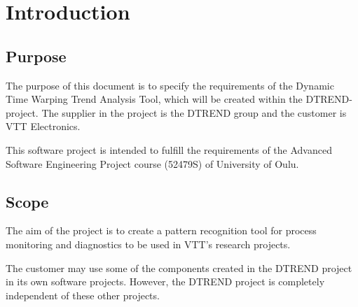 \documentclass[a4paper,11pt]{article}
\begin{document}
\tableofcontents
\newpage

\section{Introduction}

\subsection{Purpose}

The purpose of this document is to specify the requirements of the Dynamic Time Warping Trend Analysis Tool,
which will be created within the DTREND-project. The supplier in the project is the DTREND group and the customer 
is VTT Electronics.

This software project is intended to fulfill the requirements of the Advanced Software Engineering Project course 
(52479S) of University of Oulu.

\subsection{Scope}

The aim of the project is to create a pattern recognition tool for process monitoring and diagnostics to be used in
VTT's research projects.

The customer may use some of the components created in the DTREND project in its own software projects. 
However, the DTREND project is completely independent of these other projects. 
\end{document}

